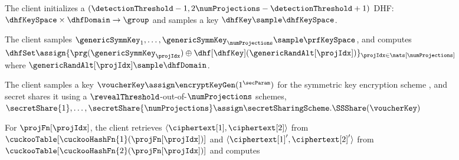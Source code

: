 \begin{figure}[th!]
\begin{mdframed}
\item The client initializes a $(\detectionThreshold -1, 2\numProjections - \detectionThreshold + 1)$ DHF: $\dhfKeySpace \times \dhfDomain \rightarrow \group$ and samples a key $\dhfKey \sample \dhfKeySpace$. 

\item\label{fuzzy:pre:prg} The client samples $\genericSymmKey_1, \dots, \genericSymmKey_\numProjections \sample \prfKeySpace$, and computes $\dhfSet \assign \{\prg(\genericSymmKey_\projIdx) \oplus \dhf[\dhfKey](\genericRandAlt[\projIdx])\}_{\projIdx \in \nats[\numProjections]}$ where $\genericRandAlt[\projIdx] \sample \dhfDomain$.

\item The client samples a key $\voucherKey \assign \encryptKeyGen(1^\secParam)$ for the symmetric key encryption scheme \encryptionSchemeDefn, and secret shares it using a 
$\revealThreshold$-out-of-$\numProjections$ schemes, 
$\secretShare{1}, \dots, \secretShare{\numProjections} \assign \secretSharingScheme.\SSShare(\voucherKey)$


\item\label{fuzzy:pre:match_cht} For $\projFn[\projIdx]$, the client retrieves $\langle \ciphertext[1], \ciphertext[2] \rangle$ from $\cuckooTable[\cuckooHashFn{1}(\projFn[\projIdx])]$ and 
$\langle \ciphertext[1]', \ciphertext[2]' \rangle$ from $\cuckooTable[\cuckooHashFn{2}(\projFn[\projIdx])]$ and computes

\enumListStartResume


\end{mdframed}
\end{figure}
